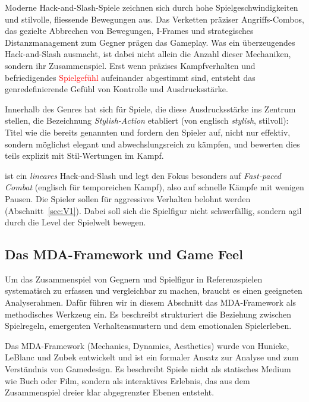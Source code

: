 \documentclass[../Main.tex]{subfiles}
\begin{document}
Moderne Hack-and-Slash-Spiele zeichnen sich durch hohe Spielgeschwindigkeiten und stilvolle, fliessende Bewegungen aus. Das Verketten präziser Angriffs-Combos, das gezielte Abbrechen von Bewegungen, I-Frames und strategisches Distanzmanagement zum Gegner prägen das Gameplay. Was ein überzeugendes Hack-and-Slash ausmacht, ist dabei nicht allein die Anzahl dieser Mechaniken, sondern ihr Zusammenspiel. Erst wenn präzises Kampfverhalten und befriedigendes \textcolor{red}{Spielgefühl} aufeinander abgestimmt sind, entsteht das genredefinierende Gefühl von Kontrolle und Ausdrucksstärke.\autocite[5--7]{lindgren2025striking}

Innerhalb des Genres hat sich für Spiele, die diese Ausdrucksstärke ins Zentrum stellen, die Bezeichnung \textit{Stylish-Action} etabliert (von englisch \textit{stylish}, stilvoll): Titel wie die bereits genannten  und  fordern den Spieler auf, nicht nur effektiv, sondern möglichst elegant und abwechslungsreich zu kämpfen, und bewerten dies teils explizit mit Stil-Wertungen im Kampf.

 ist ein \textit{lineares} Hack-and-Slash und legt den Fokus besonders auf \textit{Fast-paced Combat} (englisch für temporeichen Kampf), also auf schnelle Kämpfe mit wenigen Pausen. Die Spieler sollen für aggressives Verhalten belohnt werden (Abschnitt~\ref{sec:V1}). Dabei soll sich die Spielfigur nicht schwerfällig, sondern agil durch die Level der Spielwelt bewegen.

\subsection{Das MDA-Framework und Game Feel} \label{sec:MDA}
Um das Zusammenspiel von Gegnern und Spielfigur in Referenzspielen systematisch zu erfassen und vergleichbar zu machen, braucht es einen geeigneten Analyserahmen. Dafür führen wir in diesem Abschnitt das MDA-Framework als methodisches Werkzeug ein. Es beschreibt strukturiert die Beziehung zwischen Spielregeln, emergenten Verhaltensmustern und dem emotionalen Spielerleben.

Das MDA-Framework (Mechanics, Dynamics, Aesthetics) wurde von Hunicke, LeBlanc und Zubek entwickelt und ist ein formaler Ansatz zur Analyse und zum Verständnis von Gamedesign. Es beschreibt Spiele nicht als statisches Medium wie Buch oder Film, sondern als interaktives Erlebnis, das aus dem Zusammenspiel dreier klar abgegrenzter Ebenen entsteht.\autocite[\textcolor{red}{S.~??}]{hunicke2004mda}
\end{document}
